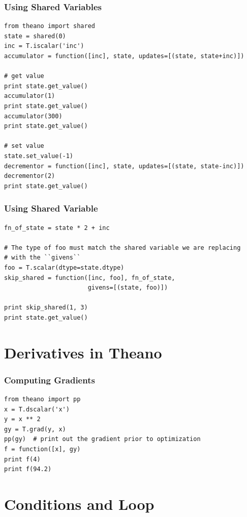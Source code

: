 \documentclass{beamer}
\begin{document}
\begin{frame}[fragile]
  \frametitle{Using Shared Variables}

\begin{verbatim}
from theano import shared
state = shared(0)
inc = T.iscalar('inc')
accumulator = function([inc], state, updates=[(state, state+inc)])

# get value
print state.get_value()
accumulator(1)
print state.get_value()
accumulator(300)
print state.get_value()

# set value
state.set_value(-1)
decrementor = function([inc], state, updates=[(state, state-inc)])
decrementor(2)
print state.get_value()
\end{verbatim}
\end{frame}

\begin{frame}[fragile]
  \frametitle{Using Shared Variable}

\begin{verbatim}
fn_of_state = state * 2 + inc

# The type of foo must match the shared variable we are replacing
# with the ``givens``
foo = T.scalar(dtype=state.dtype)
skip_shared = function([inc, foo], fn_of_state,
                       givens=[(state, foo)])

print skip_shared(1, 3)
print state.get_value()
\end{verbatim}
\end{frame}

\section{Derivatives in Theano}

\begin{frame}[fragile]
  \frametitle{Computing Gradients}

\begin{verbatim}
from theano import pp
x = T.dscalar('x')
y = x ** 2
gy = T.grad(y, x)
pp(gy)  # print out the gradient prior to optimization
f = function([x], gy)
print f(4)
print f(94.2)
\end{verbatim}
\end{frame}

\section{Conditions and Loop}
\end{document}
